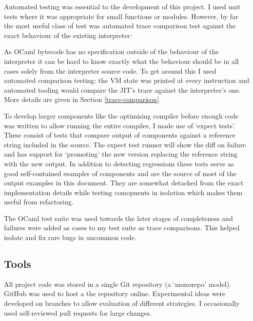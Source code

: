 Automated testing was essential to the development of this project. I used unit tests where it was
appropriate for small functions or modules. However, by far the most useful class of test was
automated trace comparison test against the exact behaviour of the existing interpreter:

As OCaml bytecode has no specification outside of the behaviour of the interpreter it can be hard
to know exactly what the behaviour should be in all cases solely from the interpreter source code.
To get around this I used automated comparison testing: the VM state was printed at every
instruction and automated
tooling would compare the JIT's trace against the interpreter's one. More details are given in
Section \ref{trace-comparison}.

To develop larger components like the optimising compiler before enough code was written to allow
running the entire compiler, I made use of `expect tests'. These consist of tests that compare
output of components against a reference string included in the source. The expect test runner will
show the diff on failure and has support for `promoting' the new version replacing the reference
string with the new output. In addition to detecting regressions these tests serve as good
self-contained esamples of components and are the source of most of the output examples in this
document. They are somewhat detached from the exact implementation details while testing comopnents
in isolation which makes them useful from refactoring.

The OCaml test suite was used towards the later stages of completeness and failures were added as
cases to my test suite as trace comparisons. This helped isolate and fix rare bugs in uncommon
code.


\subsection{Tools}

All project code was stored in a single Git repository (a `monorepo' model). GitHub was used to
host a the repository online. Experimental ideas were developed on
branches to allow evaluation of different
strategies. I occasionally used self-reviewed pull requests for large changes.

